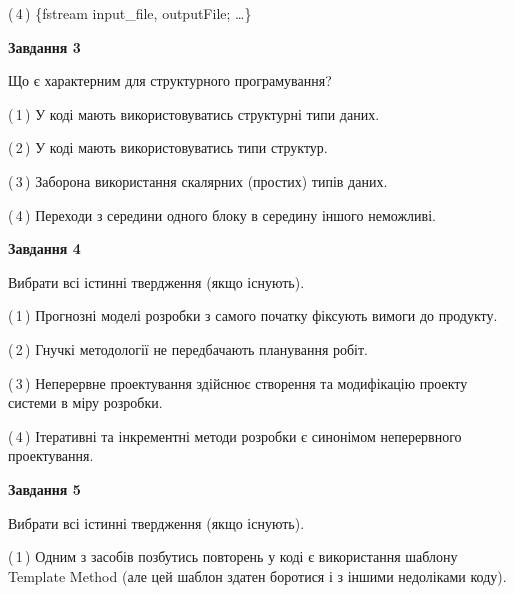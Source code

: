 \documentclass[10pt, ukrainian]{article}
\begin{document}
{\begin {large}
(\,4\,) \{fstream input\_file, outputFile; …\}%


{\begin {center}\textbf{Завдання 3}\end {center}}\par
Що є характерним для структурного програмування?\par
\vspace{2mm}



(\,1\,) У коді мають використовуватись структурні типи даних. %



(\,2\,) У коді мають використовуватись типи структур. %



(\,3\,) Заборона використання скалярних (простих) типів даних. %



(\,4\,) Переходи з середини одного блоку в середину іншого неможливі. %


{\begin {center}\textbf{Завдання 4}\end {center}}\par
Вибрати всі істинні твердження (якщо існують).\par
\vspace{2mm}



(\,1\,) Прогнозні моделі розробки з самого початку фіксують вимоги до продукту. %



(\,2\,) Гнучкі методології не передбачають планування робіт. %



(\,3\,) Неперервне проектування здійснює створення та модифікацію проекту системи в міру розробки. %



(\,4\,) Ітеративні та інкрементні методи розробки є синонімом неперервного проектування. %


{\begin {center}\textbf{Завдання 5}\end {center}}\par
Вибрати всі істинні твердження (якщо існують).\par
\vspace{2mm}



(\,1\,) Одним з засобів позбутись повторень у коді є використання шаблону Template Method (але цей шаблон здатен боротися і з іншими недоліками коду). %




\end{large}}
\end{document}
